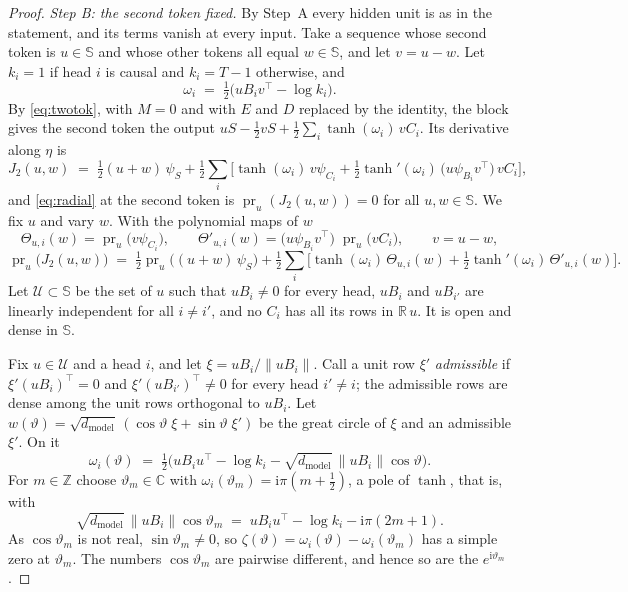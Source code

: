 \documentclass[10pt]{article}
\theoremstyle{definition}
\theoremstyle{remark}
\newcommand{\R}{\mathbb{R}}
\newcommand{\dm}{d_{\mathrm{model}}}
\newcommand{\norm}[1]{\lVert #1\rVert}
\begin{document}
\begin{proof}
\emph{Step B: the second token fixed.} By Step~A every hidden unit is as in the statement, and its terms vanish at every input. Take a sequence whose second token is $u \in \mathbb S$ and whose other tokens all equal $w \in \mathbb S$, and let $v = u - w$. Let $k_i = 1$ if head $i$ is causal and $k_i = T - 1$ otherwise, and
\[
\omega_i \;=\; \tfrac12\big(uB_iv^\top - \log k_i\big).
\]
By \eqref{eq:twotok}, with $M = 0$ and with $E$ and $D$ replaced by the identity, the block gives the second token the output $uS - \tfrac12vS + \tfrac12\sum_i\tanh(\omega_i)\,vC_i$. Its derivative along $\eta$ is
\[
J_2(u, w) \;=\; \tfrac12(u + w)\,\psi_S + \tfrac12\sum_i\Big[\tanh(\omega_i)\,v\psi_{C_i} + \tfrac12\tanh'(\omega_i)\,\big(u\psi_{B_i}v^\top\big)\,vC_i\Big],
\]
and \eqref{eq:radial} at the second token is $\operatorname{pr}_u(J_2(u, w)) = 0$ for all $u, w \in \mathbb S$. We fix $u$ and vary $w$. With the polynomial maps of $w$
\[
\Theta_{u,i}(w) = \operatorname{pr}_u\big(v\psi_{C_i}\big), \qquad \Theta'_{u,i}(w) = \big(u\psi_{B_i}v^\top\big)\;\operatorname{pr}_u\big(vC_i\big), \qquad v = u - w,
\]
\begin{equation}\label{eq:sphereB}
\operatorname{pr}_u\big(J_2(u, w)\big) \;=\; \tfrac12\operatorname{pr}_u\big((u + w)\,\psi_S\big) + \tfrac12\sum_i\Big[\tanh(\omega_i)\,\Theta_{u,i}(w) + \tfrac12\tanh'(\omega_i)\,\Theta'_{u,i}(w)\Big].
\end{equation}
Let $\mathcal U \subset \mathbb S$ be the set of $u$ such that $uB_i \neq 0$ for every head, $uB_i$ and $uB_{i'}$ are linearly independent for all $i \neq i'$, and no $C_i$ has all its rows in $\R\,u$. It is open and dense in $\mathbb S$.

Fix $u \in \mathcal U$ and a head $i$, and let $\xi = uB_i/\norm{uB_i}$. Call a unit row $\xi'$ \emph{admissible} if $\xi'(uB_i)^\top = 0$ and $\xi'(uB_{i'})^\top \neq 0$ for every head $i' \neq i$; the admissible rows are dense among the unit rows orthogonal to $uB_i$. Let $w(\vartheta) = \sqrt{\dm}\,(\cos\vartheta\;\xi + \sin\vartheta\;\xi')$ be the great circle of $\xi$ and an admissible $\xi'$. On it
\[
\omega_i(\vartheta) \;=\; \tfrac12\big(uB_iu^\top - \log k_i - \sqrt{\dm}\,\norm{uB_i}\cos\vartheta\big).
\]
For $m \in \mathbb Z$ choose $\vartheta_m \in \mathbb C$ with $\omega_i(\vartheta_m) = \mathrm i\pi(m + \tfrac12)$, a pole of $\tanh$, that is, with
\[
\sqrt{\dm}\,\norm{uB_i}\cos\vartheta_m \;=\; uB_iu^\top - \log k_i - \mathrm i\pi(2m+1).
\]
As $\cos\vartheta_m$ is not real, $\sin\vartheta_m \neq 0$, so $\zeta(\vartheta) = \omega_i(\vartheta) - \omega_i(\vartheta_m)$ has a simple zero at $\vartheta_m$. The numbers $\cos\vartheta_m$ are pairwise different, and hence so are the $e^{\mathrm i\vartheta_m}$.


\end{proof}
\end{document}
